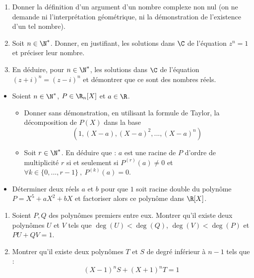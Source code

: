 \begin{exercice}
\begin{enumerate}
    \item Donner la définition d'un argument d'un nombre complexe non nul (on ne demande ni l'interprétation géométrique, ni la démonstration de l'existence d'un tel nombre).
    \item Soit $n\in \N^*$. Donner, en justifiant, les solutions dans  $\C$ de l'équation $z^{n}=1$ et préciser leur nombre.
    \item En déduire, pour $n\in \N^*$, les solutions dans $\C$ de l'équation $\left( z+i\right)^{n}=\left(z-i\right)^{n}$ et démontrer que ce sont des nombres réels.
\end{enumerate}
\end{exercice}

\begin{exercice}
\begin{itemize}
    \item Soient $n\in \N^*$, $P\in \R_n[X]$ et $a\in \R$.
    \begin{itemize}
        \item Donner sans démonstration, en utilisant la formule de Taylor, la décomposition de $P(X)$ dans la base
        \[(1,(X-a),(X-a)^2,...,(X-a)^n)\]

        \item Soit $r\in \N^*$. En déduire que :
        $a$ est une racine de $P$ d’ordre de multiplicité $r$ si et seulement si $P^{(r)}(a)\neq 0$ et $\forall k\in \{0,...,r-1\}\ , \ P^{(k)}(a) = 0$.
    \end{itemize}

    \item Déterminer deux réels $a$ et $b$ pour que $1$ soit racine double du polynôme $P = X^5 + aX^2 + bX$ et factoriser alors ce polynôme dans $\R[X]$.    
\end{itemize}
\end{exercice}

\begin{exercice}
\begin{enumerate}
 \item[a)] Soient $P, Q$ des polynômes premiers entre eux. Montrer qu'il existe deux polynômes $U$ et $V$ tels que $\deg(U)<\deg(Q)$, $\deg(V)<\deg(P)$ et $PU+QV=1$. 
 \item[b)] Montrer qu'il existe deux polynômes $T$ et $S$ de degré inférieur à $n-1$ tels que :
 \[(X-1)^{n}S+(X+1)^{n}T=1\]
\end{enumerate}
\end{exercice}

